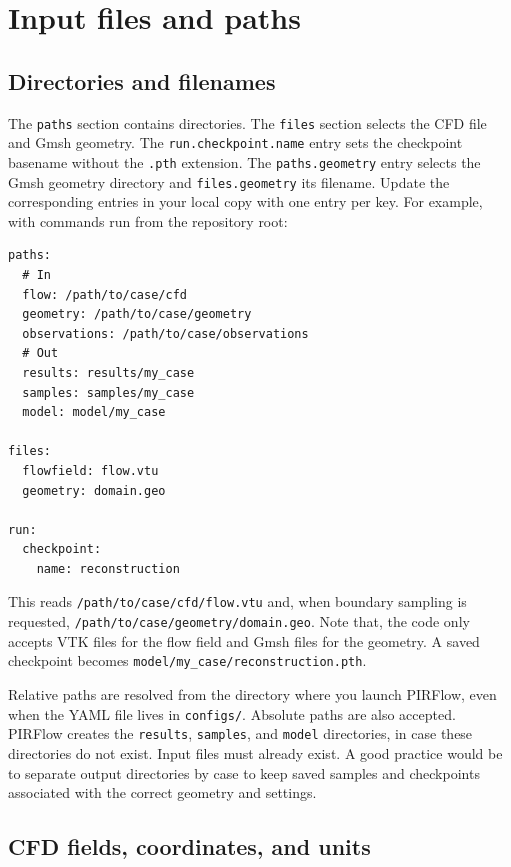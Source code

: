 \documentclass[11pt,a4paper]{article}
\newcommand{\code}[1]{\nolinkurl{#1}}
\begin{document}
\section{Input files and paths}
\label{sec:inputs}

\subsection{Directories and filenames}

The \code{paths} section contains directories. The \code{files} section selects
the CFD file and Gmsh geometry. The \code{run.checkpoint.name} entry sets the
checkpoint basename without the \code{.pth} extension. The \code{paths.geometry}
entry selects the Gmsh geometry directory and \code{files.geometry} its filename.
Update the corresponding entries in your local copy with one entry per key.
For example, with commands run from the repository root:

\begin{lstlisting}
paths:
  # In
  flow: /path/to/case/cfd
  geometry: /path/to/case/geometry
  observations: /path/to/case/observations
  # Out
  results: results/my_case
  samples: samples/my_case
  model: model/my_case

files:
  flowfield: flow.vtu
  geometry: domain.geo

run:
  checkpoint:
    name: reconstruction
\end{lstlisting}

This reads \code{/path/to/case/cfd/flow.vtu} and, when boundary sampling is
requested, \code{/path/to/case/geometry/domain.geo}. Note that, the code only accepts 
VTK files for the flow field and Gmsh files for the geometry. A saved checkpoint becomes
\code{model/my_case/reconstruction.pth}. 

Relative paths are resolved from the directory where you launch PIRFlow,
even when the YAML file lives in \code{configs/}. Absolute paths are also accepted.
PIRFlow creates the \code{results}, \code{samples}, and \code{model} directories, in 
case these directories do not exist. Input files must already exist. A good practice
would be to separate output directories by case to keep saved samples and 
checkpoints associated with the correct geometry and settings. 

\subsection{CFD fields, coordinates, and units}
\end{document}
